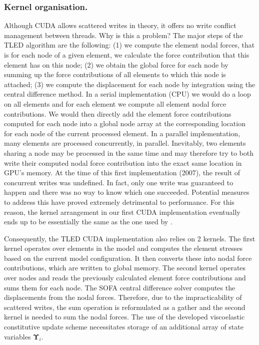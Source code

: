\subsubsection*{Kernel organisation.}
Although CUDA allows scattered writes in theory, it offers no write conflict management between threads. Why is this a problem? The major steps of the TLED algorithm are the following: (1) we compute the element nodal forces, that is for each node of a given element, we calculate the force contribution that this element has on this node; (2) we obtain the global force for each node by summing up the force contributions of all elements to which this node is attached; (3) we compute the displacement for each node by integration using the central difference method. In a serial implementation (CPU) we would do a loop on all elements and for each element we compute all element nodal force contributions. We would then directly add the element force contributions computed for each node into a global node array at the corresponding location for each node of the current processed element. In a parallel implementation, many elements are processed concurrently, in parallel. Inevitably, two elements sharing a node may be processed in the same time and may therefore try to both write their computed nodal force contribution into the exact same location in GPU's memory. At the time of this first implementation (2007), the result of concurrent writes was undefined. In fact, only one write was guaranteed to happen and there was no way to know which one succeeded. Potential measures to address this have proved extremely detrimental to performance. For this reason, the kernel arrangement in our first CUDA implementation eventually ends up to be essentially the same as the one used by \cite{Taylor07b}.

Consequently, the TLED CUDA implementation also relies on 2 kernels. The first kernel operates over elements in the model and computes the element stresses based on the current model configuration. It then converts these into nodal force contributions, which are written to global memory. The second kernel operates over nodes and reads the previously calculated element force contributions and sums them for each node. The SOFA central difference solver computes the displacements from the nodal forces. Therefore, due to the impracticability of scattered writes, the sum operation is reformulated as a gather and the second kernel is needed to sum the nodal forces. The use of the developed viscoelastic constitutive update scheme necessitates storage of an additional array of state variables $ \boldsymbol \Upsilon_i $.

